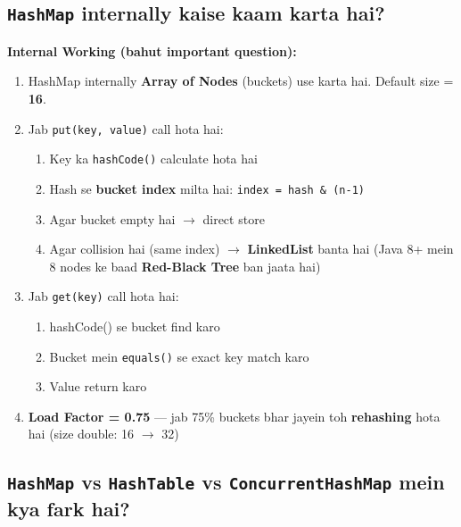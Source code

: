 \documentclass[12pt,a4paper]{article}
\begin{document}
\subsection{\texttt{HashMap} internally kaise kaam karta hai?}

\begin{answerbox}
\textbf{Internal Working (bahut important question):}
\begin{enumerate}
    \item HashMap internally \textbf{Array of Nodes} (buckets) use karta hai. Default size = \textbf{16}.
    \item Jab \texttt{put(key, value)} call hota hai:
    \begin{enumerate}
        \item Key ka \texttt{hashCode()} calculate hota hai
        \item Hash se \textbf{bucket index} milta hai: \texttt{index = hash \& (n-1)}
        \item Agar bucket empty hai $\rightarrow$ direct store
        \item Agar collision hai (same index) $\rightarrow$ \textbf{LinkedList} banta hai (Java 8+ mein 8 nodes ke baad \textbf{Red-Black Tree} ban jaata hai)
    \end{enumerate}
    \item Jab \texttt{get(key)} call hota hai:
    \begin{enumerate}
        \item hashCode() se bucket find karo
        \item Bucket mein \texttt{equals()} se exact key match karo
        \item Value return karo
    \end{enumerate}
    \item \textbf{Load Factor = 0.75} --- jab 75\% buckets bhar jayein toh \textbf{rehashing} hota hai (size double: 16 $\rightarrow$ 32)
\end{enumerate}
\end{answerbox}

\subsection{\texttt{HashMap} vs \texttt{HashTable} vs \texttt{ConcurrentHashMap} mein kya fark hai?}
\end{document}
